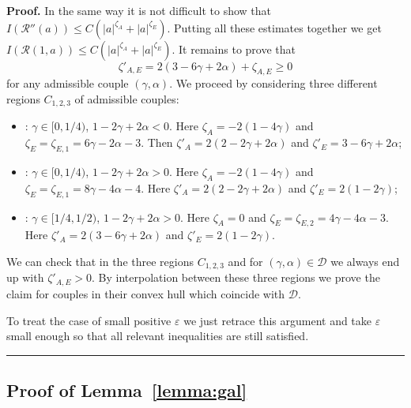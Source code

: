 \documentclass[a4paper,12pt,reqno]{article}
\newcommand{\eps}{\varepsilon}
\newcommand{\DD}{\mathcal{D}}
\newcommand{\cR}{\mathcal{R}}
\newenvironment{proof}[1][Proof]{\textbf{#1.} }{\ \rule{0.5em}{0.5em}}
\begin{document}
\begin{proof}
In the same way it is not difficult to show that $I(\cR''(a)) \le C (|a|^{\zeta_A}+ |a|^{\zeta_E})$. Putting all these estimates together we get
$
I(\cR(1,a)) \le C (|a|^{\zeta_A}+ |a|^{\zeta_E})
$. It remains to prove that
\begin{equation}
  \label{eq:cases-res}
\zeta'_{A,E} = 2(3-6\gamma+2\alpha)+\zeta_{A,E}  \ge 0  
\end{equation}
for any admissible couple $(\gamma,\alpha)$.
We proceed by considering three different regions $C_{1,2,3}$ of admissible couples:
\begin{itemize}
\item[$C_1$]: $\gamma \in [0,1/4)$, $1-2\gamma+2\alpha < 0$. Here $\zeta_A = -2(1-4\gamma)$ and $\zeta_E = \zeta_{E,1} = 6\gamma-2\alpha-3$. Then $\zeta'_A = 2(2-2\gamma+2\alpha)$ and $\zeta'_E = 3-6\gamma+2\alpha$;

\item[$C_2$]: $\gamma \in [0,1/4)$, $1-2\gamma+2\alpha > 0$. Here $\zeta_A = -2(1-4\gamma)$ and $\zeta_E= \zeta_{E,1} = 8\gamma-4\alpha-4$. Here $\zeta'_A = 2(2-2\gamma+2\alpha)$ and $\zeta'_E = 2(1-2\gamma)$;
 
\item[$C_3$]: $\gamma \in [1/4,1/2)$, $1-2\gamma+2\alpha > 0$. Here $\zeta_A = 0$ and $\zeta_E = \zeta_{E,2} =  4\gamma-4\alpha-3$. Here $\zeta'_A = 2(3-6\gamma+2\alpha)$ and $\zeta'_E = 2(1-2\gamma)$.

\end{itemize}
We can check that in the three regions $C_{1,2,3}$ and for $(\gamma,\alpha) \in \DD$ we always end up with $\zeta'_{A,E} > 0$. By interpolation between these three regions we  prove the claim for couples in their convex hull which coincide with $\DD$.

To treat the case of small positive $\eps$ we just retrace this argument and take $\eps$ small enough so that all relevant inequalities are still satisfied. 
\end{proof}



\subsection{Proof of Lemma~\ref{lemma:gal}}
\end{document}
